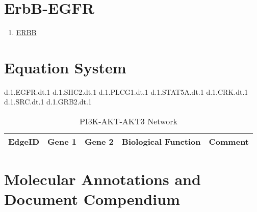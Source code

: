 
\section{ErbB-EGFR}

\begin{enumerate}
\item \href{https://www.genome.jp/kegg-bin/show_pathway?map=hsa04012&show_description=show}{ERBB}

\end{enumerate}

\section{Equation System}

d.1.EGFR.dt.1 
d.1.SHC2.dt.1 
d.1.PLCG1.dt.1 
d.1.STAT5A.dt.1 
d.1.CRK.dt.1 
d.1.SRC.dt.1 
d.1.GRB2.dt.1  


\begin{table}[H]
	\tiny
	\begin{tabular}{p{1cm}p{1cm}p{3cm}p{1cm}p{1cm}} 
		EdgeID & Gene 1 & Gene 2 & Biological Function & Comment \\
		\hline
    
    \end{tabular}
	\caption{PI3K-AKT-AKT3 Network}
	\label{tab:Table2}
\end{table}


\section{Molecular Annotations and Document Compendium}

